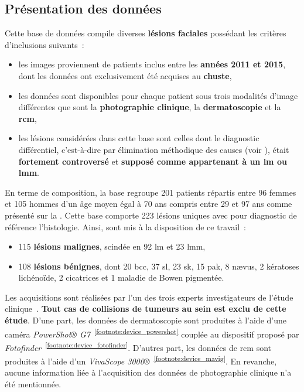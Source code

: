 \subsection{Présentation des données}
\label{sec:dataset_introduction}
Cette base de données compile diverses \textbf{lésions faciales} possédant les critères d'inclusions suivants~:
\begin{itemize}
    \item les images proviennent de patients inclus entre les \textbf{années 2011 et 2015}, dont les données ont exclusivement été acquises au \textbf{\gls{chuste}},
    \item les données sont disponibles pour chaque patient sous trois modalités d'image différentes que sont la \textbf{photographie clinique}, la \textbf{dermatoscopie} et la \textbf{\gls{rcm}},
    \item les lésions considérées dans cette base sont celles dont le diagnostic différentiel, c’est-à-dire par élimination méthodique des causes (voir ), était \textbf{fortement controversé} et \textbf{supposé comme appartenant à un \gls{lm} ou \gls{lmm}}.
\end{itemize}\par

En terme de composition, la base regroupe 201 patients répartis entre 96 femmes et 105 hommes d'un âge moyen égal à 70 ans compris entre 29 et 97 ans comme présenté sur la . Cette base comporte 223 lésions uniques avec pour diagnostic de référence l'histologie. Ainsi, sont mis à la disposition de ce travail~:
\begin{itemize}
    \item 115 \textbf{lésions malignes}, scindée en 92 \gls{lm} et 23 \gls{lmm},
    \item 108 \textbf{lésions bénignes}, dont 20 \gls{bcc}, 37 \gls{sl}, 23 \gls{sk}, 15 \gls{pak}, 8 nævus, 2 kératoses lichénoïde, 2 cicatrices et 1 maladie de Bowen pigmentée.
\end{itemize}\par

Les acquisitions sont réalisées par l'un des trois experts investigateurs de l'étude clinique~\cite{Cinotti2018}. \textbf{Tout cas de collisions de tumeurs au sein est exclu de cette étude}. D'une part, les données de dermatoscopie sont produites à l'aide d'une caméra \textit{PowerShot® G7}~\textsuperscript{\ref{footnote:device_powershot}} couplée au dispositif proposé par \textit{Fotofinder}~\textsuperscript{\ref{footnote:device_fotofinder}}. D'autres part, les données de \gls{rcm} sont produites à l'aide d'un \textit{VivaScope 3000®}~\textsuperscript{\ref{footnote:device_mavig}}. En revanche, aucune information liée à l'acquisition des données de photographie clinique n'a été mentionnée.\par

